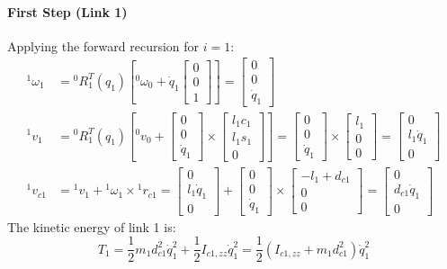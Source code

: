 \documentclass[11pt,a4paper]{article}
\begin{document}
\paragraph{First Step (Link 1)}
Applying the forward recursion for $i=1$:
\begin{align}
    {}^1\omega_1 &= {}^0R_1^T(q_1) \left[ {}^0\omega_0 + \dot{q}_1 \begin{bmatrix} 0 \\ 0 \\ 1 \end{bmatrix} \right] = \begin{bmatrix} 0 \\ 0 \\ \dot{q}_1 \end{bmatrix} \\
    {}^1v_1 &= {}^0R_1^T(q_1) \left[ {}^0v_0 + \begin{bmatrix} 0 \\ 0 \\ \dot{q}_1 \end{bmatrix} \times \begin{bmatrix} l_1 c_1 \\ l_1 s_1 \\ 0 \end{bmatrix} \right] = \begin{bmatrix} 0 \\ 0 \\ \dot{q}_1 \end{bmatrix} \times \begin{bmatrix} l_1 \\ 0 \\ 0 \end{bmatrix} = \begin{bmatrix} 0 \\ l_1 \dot{q}_1 \\ 0 \end{bmatrix} \\
    {}^1v_{c1} &= {}^1v_1 + {}^1\omega_1 \times {}^1r_{c1} = \begin{bmatrix} 0 \\ l_1 \dot{q}_1 \\ 0 \end{bmatrix} + \begin{bmatrix} 0 \\ 0 \\ \dot{q}_1 \end{bmatrix} \times \begin{bmatrix} -l_1 + d_{c1} \\ 0 \\ 0 \end{bmatrix} = \begin{bmatrix} 0 \\ d_{c1}\dot{q}_1 \\ 0 \end{bmatrix}
\end{align}
The kinetic energy of link 1 is:
\begin{equation}
    T_1 = \frac{1}{2}m_1 d_{c1}^2 \dot{q}_1^2 + \frac{1}{2}I_{c1,zz}\dot{q}_1^2 = \frac{1}{2}(I_{c1,zz} + m_1 d_{c1}^2)\dot{q}_1^2
\end{equation}
\end{document}
